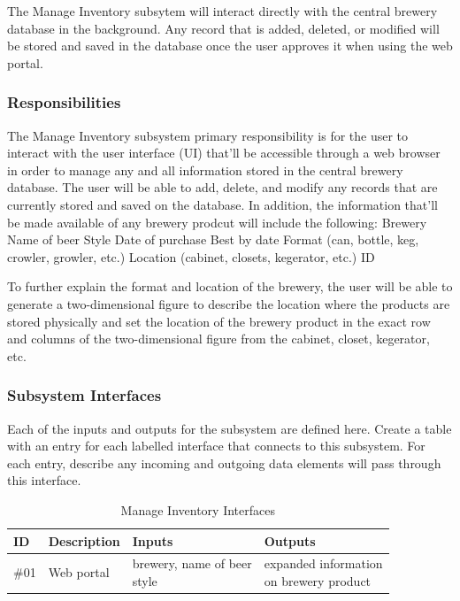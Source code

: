 The Manage Inventory subsytem will interact directly with the central brewery database in the background.  Any record that is added, deleted, or modified will be stored and saved in the database once the user approves it when using the web portal.

\subsubsection{Responsibilities}
The Manage Inventory subsystem primary responsibility is for the user to interact with the user interface (UI) that'll be accessible through a web browser in order to manage any and all information stored in the central brewery database.  The user will be able to add, delete, and modify any records that are currently stored and saved on the database.  In addition, the information that'll be made available of any brewery prodcut will include the following:
Brewery
Name of beer
Style
Date of purchase
Best by date
Format (can, bottle, keg, crowler, growler, etc.)
Location (cabinet, closets, kegerator, etc.)
ID

To further explain the format and location of the brewery, the user will be able to generate a two-dimensional figure to describe the location where the products are stored physically and set the location of the brewery product in the exact row and columns of the two-dimensional figure from the cabinet, closet, kegerator, etc.

\subsubsection{Subsystem Interfaces}
Each of the inputs and outputs for the subsystem are defined here. Create a table with an entry for each labelled interface that connects to this subsystem. For each entry, describe any incoming and outgoing data elements will pass through this interface.

\begin {table}[H]
\caption {Manage Inventory Interfaces} 
\begin{center}
    \begin{tabular}{ | p{1cm} | p{6cm} | p{3cm} | p{3cm} |}
    \hline
    ID & Description & Inputs & Outputs \\ \hline
    \#01 & Web portal & \pbox{3cm}{brewery, name of beer \\ style} & \pbox{3cm}{expanded information \\ on brewery product}  \\ \hline
    \end{tabular}
\end{center}
\end{table}

